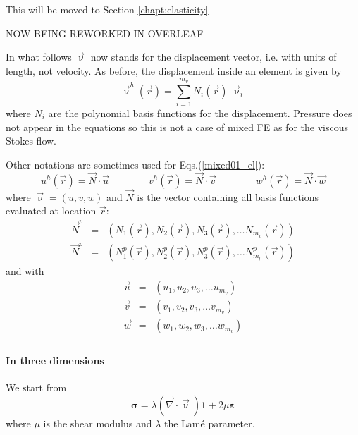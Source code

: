 
{\large \color{orange} This will be moved to Section \ref{chapt:elasticity}}


NOW BEING REWORKED IN OVERLEAF

In what follows $\vec\upnu$ now stands for the displacement vector, i.e. 
with units of length, not velocity. 
As before, the displacement inside an element is given by 
\begin{equation}
{\vec \upnu}^h({\vec r})=\sum_{i=1}^{m_v} N_i({\vec r})\;  {\vec \upnu}_i
\label{mixed01_el}
\end{equation}
where $N_i$ are the polynomial basis functions for the displacement.
Pressure does not appear in the equations so this is not a case of 
mixed FE as for the viscous Stokes flow. 

Other notations are sometimes used for Eqs.(\ref{mixed01_el}):
\begin{equation}
u^h({\vec r}) = \vec{N} \cdot \vec{u}
\quad\quad\quad\quad
v^h({\vec r}) = \vec{N} \cdot \vec{v}
\quad\quad\quad\quad
w^h({\vec r}) = \vec{N} \cdot \vec{w}
\end{equation} 
where ${\vec \upnu}=(u,v,w)$ and $\vec{N}$ 
is the vector containing all basis functions evaluated at location ${\vec r}$:
\begin{eqnarray}
\vec{N}^v &=& \left( N_1({\vec r}),  N_2({\vec r}),  N_3({\vec r}), \dots  N_{m_v}({\vec r}) \right) \\
\vec{N}^p &=& \left( N_1^p({\vec r}),  N_2^p({\vec r}),  N_3^p({\vec r}), \dots  N_{m_p}^p({\vec r}) \right)
\end{eqnarray}
and with 
\begin{eqnarray}
\vec{u} &=& \left( u_1,  u_2,  u_3, \dots  u_{m_v} \right) \\
\vec{v} &=& \left( v_1,  v_2,  v_3, \dots  v_{m_v} \right) \\
\vec{w} &=& \left( w_1,  w_2,  w_3, \dots  w_{m_v} \right) \\
\end{eqnarray}

\paragraph{In three dimensions} We start from
\[
{\bm \sigma} = \lambda (\vec\nabla\cdot \vec\upnu) {\bm 1}+ 2\mu {\bm \varepsilon}
\]
where $\mu$ is the shear modulus and $\lambda$ the Lam{\'e} parameter.

